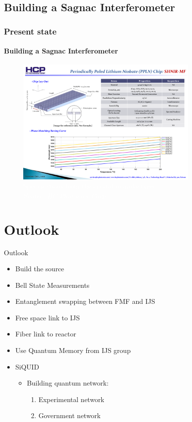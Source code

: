 \documentclass[serif,8pt]{beamer}
\begin{document}
\subsection{Building a Sagnac Interferometer}
\begin{frame}[t]
	\frametitle{Present state}
	\framesubtitle{Building a Sagnac Interferometer}
	  \pause
	\begin{figure}[!ht]
	  \centering
	  \includegraphics[width=9cm]{Type0Gratings.pdf}
	  \caption{\textcolor{white}{Specifications from the crystal manufacturer.\\\textit{Source: HC Photonics Corp.}}}
	\end{figure}
\end{frame}
\usebackgroundtemplate{}


\section{Outlook}
\begin{frame}{Outlook}
	\begin{itemize}
		\item Build the source
		\item Bell State Measurements %
		\item Entanglement swapping between FMF and IJS
		\item Free space link to IJS
		\item Fiber link to reactor
		\item Use Quantum Memory from IJS group
		\item SiQUID
			\begin{itemize}
				\item Building quantum network:
					\begin{enumerate}
						\item Experimental network
						\item Government network 
					\end{enumerate}
			\end{itemize}
	\end{itemize}
\end{frame}
\end{document}
